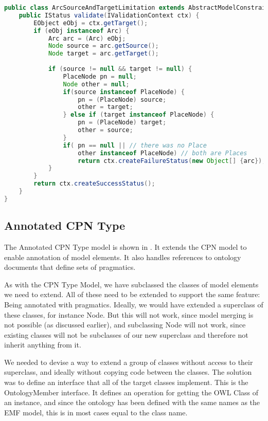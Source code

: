 \begin{lstlisting}[language=Java,label=lst:constraintimpl,float,
caption=Constraint Implementation]
public class ArcSourceAndTargetLimitation extends AbstractModelConstraint {
	public IStatus validate(IValidationContext ctx) {
		EObject eObj = ctx.getTarget();
		if (eObj instanceof Arc) {
			Arc arc = (Arc) eObj;
			Node source = arc.getSource();
			Node target = arc.getTarget();
			
			if (source != null && target != null) {
				PlaceNode pn = null;
				Node other = null;
				if(source instanceof PlaceNode) {
					pn = (PlaceNode) source;
					other = target;
				} else if (target instanceof PlaceNode) {
					pn = (PlaceNode) target;
					other = source;
				}
				if(	pn == null || // there was no Place
					other instanceof PlaceNode) // both are Places
					return ctx.createFailureStatus(new Object[] {arc});
			} 
		} 
		return ctx.createSuccessStatus();
	}
}
\end{lstlisting}

\subsection{Annotated CPN Type}
The Annotated CPN Type model is shown in . It extends
the CPN model to enable annotation of model elements. It also handles references
to ontology documents that define sets of pragmatics.


As with the CPN Type Model, we have subclassed the classes of model elements we
need to extend. All of these need to be extended to support the same feature:
Being annotated with pragmatics. Ideally, we would have extended a superclass of
these classes, for instance Node. But this will not work, since model merging is
not possible (as discussed earlier), and subclassing Node will not work, since
existing classes will not be subclasses of our new superclass and therefore not
inherit anything from it. 

We needed to devise a way to extend a group of classes without access to their
superclass, and ideally without copying code between the classes. The solution
was to define an interface that all of the target classes implement. This is the
OntologyMember interface. It defines an operation for getting the OWL Class of
an instance, and since the ontology has been defined with the same names as the
EMF model, this is in most cases equal to the class name. 

